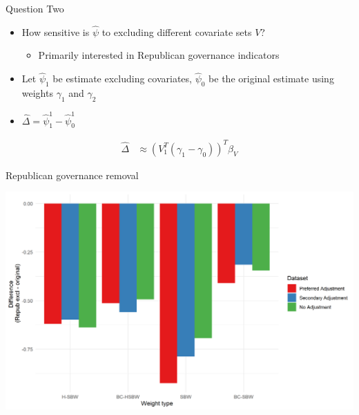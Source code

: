 \documentclass[hyperref={pdfpagelabels=false}]{beamer}
\begin{document}
\begin{frame}{Question Two}
    \begin{itemize}
        \item How sensitive is $\hat{\psi}$ to excluding different covariate sets $V$? \bigskip 
        \begin{itemize}
            \item Primarily interested in Republican governance indicators \bigskip
        \end{itemize}
        \item Let $\hat{\psi}_1$ be estimate excluding covariates, $\hat{\psi}_0$ be the original estimate using weights $\gamma_1$ and $\gamma_2$ \bigskip
        \item $\hat{\Delta} = \hat{\psi}^1_1 - \hat{\psi}^1_0$ \bigskip
    \end{itemize}
\begin{align*}
\hat{\Delta} &\approx (V_1^T(\gamma_1 - \gamma_0))^T\beta_V
\end{align*}

\end{frame}

\begin{frame}{Republican governance removal}
\begin{center}
	\includegraphics[scale=0.5]{01_Plots/repub-diff-c1-robustness.png}
\end{center}
\end{frame}
\end{document}
